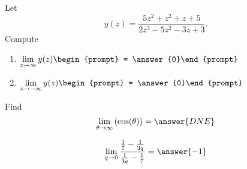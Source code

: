 \documentclass[handout]{ximera}
\begin{document}
\begin{exercise}
Let 
\[
y(z) = \frac{5 z^2+z^2+z+5}{2 z^3-5 z^2-3 z+3}.
\]
Compute
\begin{enumerate}
\item $\displaystyle\lim_{z\to \infty} y(z) \begin{prompt} = \answer{0}\end{prompt}$
\item $\displaystyle\lim_{z\to -\infty}y(z) \begin{prompt} = \answer{0}\end{prompt}$
\end{enumerate}

\end{exercise}

\begin{exercise}
Find
\[
\lim_{\theta\to\infty}\left(\cos(\theta)\right)
= \answer{DNE}
\]
\end{exercise}

\begin{exercise}
\[\lim_{q \to 0} \frac{\frac{1}{7}-\frac{1}{3q}}{\frac{1}{3q}-\frac{1}{7}} = \answer{-1}\]
\end{exercise}
\end{document}
